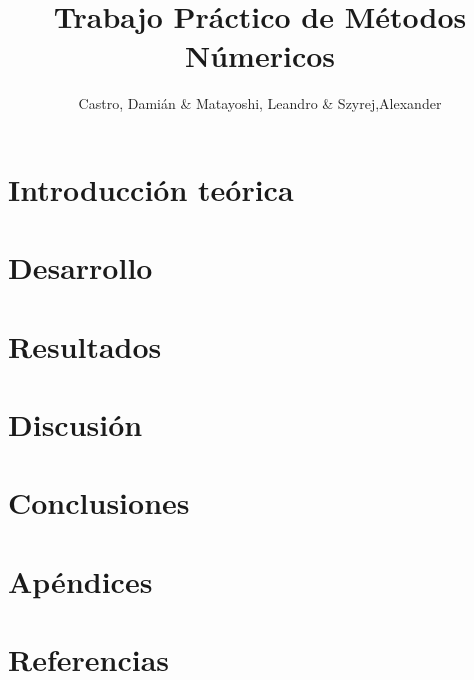 \documentclass[a4paper,11pt]{article}
\title{Trabajo Práctico de Métodos Númericos}
\author{Castro, Dami\'an \& Matayoshi, Leandro \& Szyrej,Alexander}
\begin{document}


\newpage

\tableofcontents

\newpage

\section{Introducción teórica}



\section{Desarrollo}



\section{Resultados}



\section{Discusión}



\section{Conclusiones}



\section{Apéndices}



\section{Referencias}


\end{document}
